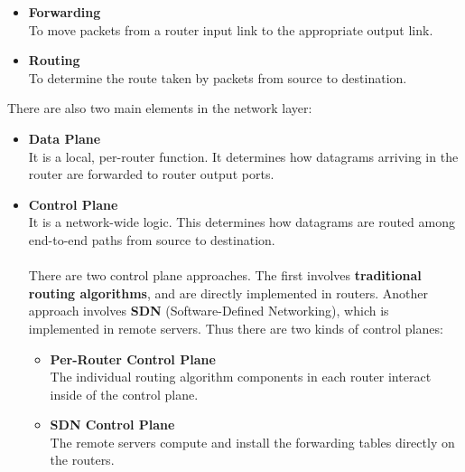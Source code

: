 \documentclass{article}
\begin{document}
\begin{itemize}
	\item \textbf{Forwarding}
	\vspace{.2cm} \\
	To move packets from a router input link to the appropriate output link.
	
	\item \textbf{Routing}
	\vspace{.2cm} \\
	To determine the route taken by packets from source to destination.
\end{itemize}
There are also two main elements in the network layer:

\begin{itemize}
	\item \textbf{Data Plane}
	\vspace{.2cm} \\
	It is a local, per-router function. It determines how datagrams arriving in the router are forwarded to router output ports.
	
	\item \textbf{Control Plane}
	\vspace{.2cm} \\
	It is a network-wide logic. This determines how datagrams are routed among end-to-end paths from source to destination. \\ \\
	There are two control plane approaches. The first involves \textbf{traditional routing algorithms}, and are directly implemented in routers. Another approach involves \textbf{SDN} (Software-Defined Networking), which is implemented in remote servers. Thus there are two kinds of control planes:
	
	\begin{itemize}
		\item \textbf{Per-Router Control Plane}
		\vspace{.2cm} \\
		The individual routing algorithm components in each router interact inside of the control plane.
		
		\item \textbf{SDN Control Plane}
		\vspace{.2cm} \\
		The remote servers compute and install the forwarding tables directly on the routers.
	\end{itemize}
\end{itemize}
\end{document}
